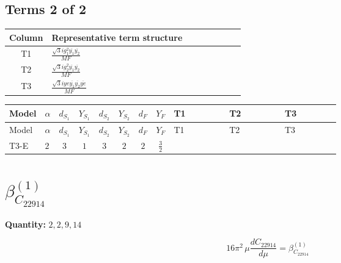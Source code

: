 \documentclass[8pt]{article}
\begin{document}
\begin{landscape}
\subsection*{Terms 2 of 2}
\begin{center}
\begin{tabular}{@{}c >{\raggedright\arraybackslash}p{0.82\linewidth}@{}}
\toprule
Column & Representative term structure \\
\midrule
T1 & \(\displaystyle \frac{\sqrt{3} i g_{1}^{2} \overline{y_{1}} \overline{y_{2}}}{MF}\) \\
\midrule
T2 & \(\displaystyle \frac{\sqrt{3} i g_{2}^{2} \overline{y_{1}} \overline{y_{2}}}{MF}\) \\
\midrule
T3 & \(\displaystyle \frac{\sqrt{3} i ye \overline{y_{1}} \overline{y_{2}} \overline{ye}}{MF}\) \\
\midrule
\bottomrule
\end{tabular}
\end{center}
\smallskip
\tiny
\begin{longtable}{@{}llcccccc >{\raggedright\arraybackslash}p{0.21\linewidth} >{\raggedright\arraybackslash}p{0.21\linewidth} >{\raggedright\arraybackslash}p{0.21\linewidth}@{}}
\toprule
Model & $\alpha$ & $d_{S_1}$ & $Y_{S_1}$ & $d_{S_2}$ & $Y_{S_2}$ & $d_F$ & $Y_F$ & T1 & T2 & T3 \\
\midrule
\endfirsthead
\toprule
Model & $\alpha$ & $d_{S_1}$ & $Y_{S_1}$ & $d_{S_2}$ & $Y_{S_2}$ & $d_F$ & $Y_F$ & T1 & T2 & T3 \\
\midrule
\endhead
T3-E & $2$ & $3$ & $1$ & $3$ & $2$ & $2$ & $\frac{3}{2}$ & \scriptsize\adjustbox{max width=\linewidth}{$\begin{gathered} \frac{9 \sqrt{3} i g_{1}^{2} \overline{y_{1}} \overline{y_{2}}}{8 MF}\end{gathered}$} & \scriptsize\adjustbox{max width=\linewidth}{$\begin{gathered} \frac{11 \sqrt{3} i g_{2}^{2} \overline{y_{1}} \overline{y_{2}}}{8 MF}\end{gathered}$} & \scriptsize\adjustbox{max width=\linewidth}{$\begin{gathered} - \frac{\sqrt{3} i ye \overline{y_{1}} \overline{y_{2}} \overline{ye}}{12 MF}\end{gathered}$} \\
\midrule
\bottomrule
\end{longtable}
\clearpage
\section*{$\beta_{C_{22914}}^{(1)}$}
\noindent\textbf{Quantity: }$\mathrm{2,2,9,14}$\par\smallskip
\[16\pi^2\,\mu\frac{d C_{22914}}{d\mu}=\beta_{C_{22914}}^{(1)}\]

\end{landscape}
\end{document}
